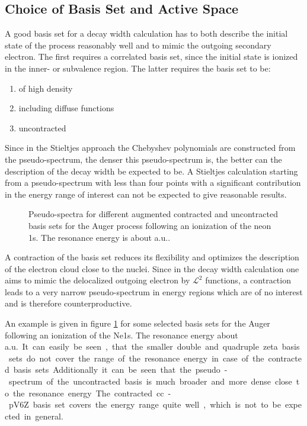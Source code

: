 \subsection{Choice of Basis Set and Active Space}
A good basis set for a decay width calculation has to both
describe the initial state of the process reasonably well and to mimic
the outgoing secondary electron. The first requires a correlated basis set, since
the initial state is ionized in the inner- or subvalence region.
The latter requires the basis set to be:


\begin{enumerate}
 \item of high density
 \item including diffuse functions
 \item uncontracted
\end{enumerate}
Since in the Stieltjes approach the Chebyshev polynomials are constructed from
the pseudo-spectrum, the denser this pseudo-spectrum is, the better can the
description of the decay width be expected to be. A Stieltjes calculation starting
from a pseudo-spectrum with less than four points with a significant contribution
in the energy range of interest can not be expected to give reasonable results.

\begin{figure}[ht]
  \centering
  
  
  \caption{Pseudo-spectra for different augmented contracted and uncontracted
           basis sets for the Auger process following an ionization of the
           neon 1s. The resonance energy is about \unit[32]{a.u.}.}
  \label{figure:bases_pseudospectra}
\end{figure}

A contraction of the basis set reduces its flexibility and optimizes the
description of the electron cloud close to the nuclei. Since in the decay width
calculation one aims to mimic the delocalized outgoing electron by
$\mathcal{L}^2$ functions, a contraction leads to a very narrow pseudo-spectrum
in energy regions which are of no interest and is therefore counterproductive.

An example is given in figure \ref{figure:bases_pseudospectra} for some selected
basis sets for the Auger following an ionization of the Ne1s. The resonance energy
about \unit[32]{a.u.}. It can easily be seen, that the smaller double and
quadruple zeta basis sets do not cover the range of the resonance energy in case
of the contracted basis sets. Additionally it can be seen that the pseudo-spectrum
of the uncontracted basis is much broader and more dense close to the resonance
energy. The contracted cc-pV6Z basis set covers the energy range quite well, which
is not to be expected in general.


